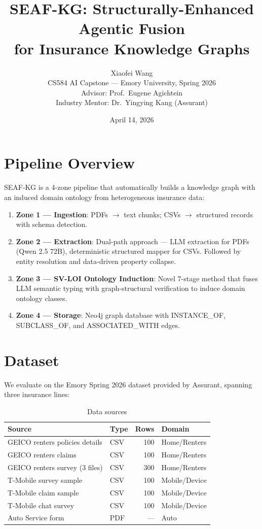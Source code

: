 \documentclass[11pt]{article}
\title{SEAF-KG: Structurally-Enhanced Agentic Fusion\\for Insurance Knowledge Graphs}
\author{Xiaofei Wang\\
CS584 AI Capstone --- Emory University, Spring 2026\\
Advisor: Prof.\ Eugene Agichtein\\
Industry Mentor: Dr.\ Yingying Kang (Assurant)}
\date{April 14, 2026}
\begin{document}
\maketitle

\section{Pipeline Overview}

SEAF-KG is a 4-zone pipeline that automatically builds a knowledge graph with an induced domain ontology from heterogeneous insurance data:

\begin{enumerate}[nosep]
    \item \textbf{Zone 1 --- Ingestion}: PDFs $\rightarrow$ text chunks; CSVs $\rightarrow$ structured records with schema detection.
    \item \textbf{Zone 2 --- Extraction}: Dual-path approach --- LLM extraction for PDFs (Qwen 2.5 72B), deterministic structured mapper for CSVs. Followed by entity resolution and data-driven property collapse.
    \item \textbf{Zone 3 --- SV-LOI Ontology Induction}: Novel 7-stage method that fuses LLM semantic typing with graph-structural verification to induce domain ontology classes.
    \item \textbf{Zone 4 --- Storage}: Neo4j graph database with INSTANCE\_OF, SUBCLASS\_OF, and ASSOCIATED\_WITH edges.
\end{enumerate}

\section{Dataset}

We evaluate on the Emory Spring 2026 dataset provided by Assurant, spanning three insurance lines:

\begin{table}[h]
\centering
\caption{Data sources}
\begin{tabular}{llrl}
\toprule
\textbf{Source} & \textbf{Type} & \textbf{Rows} & \textbf{Domain} \\
\midrule
GEICO renters policies details & CSV & 100 & Home/Renters \\
GEICO renters claims & CSV & 100 & Home/Renters \\
GEICO renters survey (3 files) & CSV & 300 & Home/Renters \\
T-Mobile survey sample & CSV & 100 & Mobile/Device \\
T-Mobile claim sample & CSV & 100 & Mobile/Device \\
T-Mobile chat survey & CSV & 100 & Mobile/Device \\
Auto Service form & PDF & --- & Auto \\
\bottomrule
\end{tabular}
\end{table}
\end{document}
